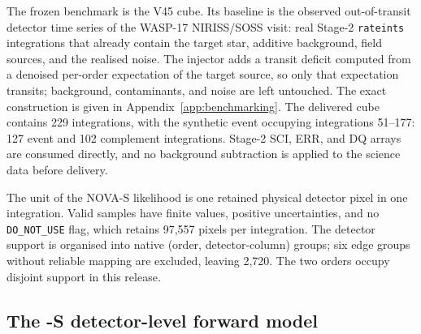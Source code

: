 The frozen benchmark is the V45 cube. Its baseline is the observed
out-of-transit detector time series of the WASP-17 NIRISS/SOSS visit: real
Stage-2 \texttt{rateints} integrations that already contain the target
star, additive background, field sources, and the realised noise. The
injector adds a transit deficit computed from a denoised per-order
expectation of the target source, so only that expectation transits;
background, contaminants, and noise are left untouched. The exact
construction is given in Appendix~\ref{app:benchmarking}. The delivered
cube contains 229 integrations, with the synthetic event occupying
integrations 51--177: 127 event and 102 complement integrations. Stage-2
SCI, ERR, and DQ arrays are consumed directly, and no background
subtraction is applied to the science data before delivery.

The unit of the NOVA-S likelihood is one retained physical detector pixel
in one integration. Valid samples have finite values, positive
uncertainties, and no \texttt{DO\_NOT\_USE} flag, which retains 97{,}557
pixels per integration. The detector support is organised into native
(order, detector-column) groups; six edge groups without reliable mapping
are excluded, leaving 2{,}720. The two orders occupy disjoint support in
this release.

\subsection{The \nova{}-S detector-level forward model}


